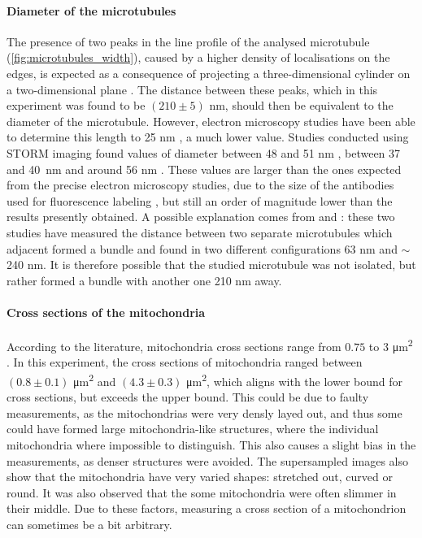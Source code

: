 \paragraph{Diameter of the microtubules}
The presence of two peaks in the line profile of the analysed microtubule (\autoref{fig:microtubules_width}), caused by a higher density of localisations on the edges, is expected as a consequence of projecting a three-dimensional cylinder on a two-dimensional plane \cite{douglass_notice_2023}.
The distance between these peaks, which in this experiment was found to be $(210 \pm 5)$ nm, should then be equivalent to the diameter of the microtubule.
However, electron microscopy studies have been able to determine this length to 25 nm \cite{moores_electron_2008}, a much lower value.
Studies conducted using STORM imaging found values of diameter between 48 and 51 nm \cite{bharadwaj_advancing_2024}, between 37 and \mbox{40 nm} \cite{douglass_super-resolution_2016} and around 56 nm \cite{bates_multicolor_2007}.
These values are larger than the ones expected from the precise electron microscopy studies, due to the size of the antibodies used for fluorescence labeling \cite{douglass_notice_2023}, but still an order of magnitude lower than the results presently obtained.
A possible explanation comes from \cite{dong_stochastic_2015} and \cite{wang_blind_2017}:
these two studies have measured the distance between two separate microtubules which adjacent formed a bundle and found in two different configurations 63 nm and $\sim$240 nm.
It is therefore possible that the studied microtubule  was not isolated, but rather formed a bundle with another one 210 nm away.

\paragraph{Cross sections of the mitochondria}
According to the literature, mitochondria cross sections range from $0.75$ to $3$ \si{\micro\meter\squared} \cite{wiemerslage_quantification_2016}. In this experiment, the cross sections of mitochondria ranged between $(0.8 \pm 0.1)$ \unit{\micro\meter\squared} and $(4.3 \pm 0.3)$ \unit{\micro\meter\squared}, which aligns with the lower bound for cross sections, but exceeds the upper bound. This could be due to faulty measurements, as the mitochondrias were very densly layed out, and thus some could have formed large mitochondria-like structures, where the individual mitochondria where impossible to distinguish. This also causes a slight bias in the measurements, as denser structures were avoided. The supersampled images also show that the mitochondria have very varied shapes: stretched out, curved or round. It was also observed that the some mitochondria were often slimmer in their middle. Due to these factors, measuring a cross section of a mitochondrion can sometimes be a bit arbitrary.

